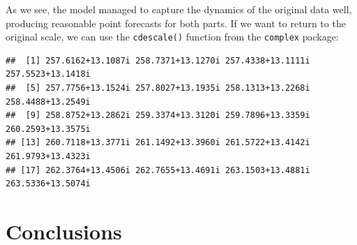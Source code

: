 \documentclass[
]{book}
\newenvironment{Shaded}{\begin{snugshade}}{\end{snugshade}}
\newcommand{\DataTypeTok}[1]{\textcolor[rgb]{0.13,0.29,0.53}{#1}}
\newcommand{\DecValTok}[1]{\textcolor[rgb]{0.00,0.00,0.81}{#1}}
\newcommand{\KeywordTok}[1]{\textcolor[rgb]{0.13,0.29,0.53}{\textbf{#1}}}
\newcommand{\NormalTok}[1]{#1}
\newcommand{\OperatorTok}[1]{\textcolor[rgb]{0.81,0.36,0.00}{\textbf{#1}}}
\newcommand{\OtherTok}[1]{\textcolor[rgb]{0.56,0.35,0.01}{#1}}
\newcommand{\StringTok}[1]{\textcolor[rgb]{0.31,0.60,0.02}{#1}}
\begin{document}
As we see, the model managed to capture the dynamics of the original data well, producing reasonable point forecasts for both parts. If we want to return to the original scale, we can use the \texttt{cdescale()} function from the \texttt{complex} package:

\begin{Shaded}
\end{Shaded}

\begin{verbatim}
##  [1] 257.6162+13.1087i 258.7371+13.1270i 257.4338+13.1111i 257.5523+13.1418i
##  [5] 257.7756+13.1524i 257.8027+13.1935i 258.1313+13.2268i 258.4488+13.2549i
##  [9] 258.8752+13.2862i 259.3374+13.3120i 259.7896+13.3359i 260.2593+13.3575i
## [13] 260.7118+13.3771i 261.1492+13.3960i 261.5722+13.4142i 261.9793+13.4323i
## [17] 262.3764+13.4506i 262.7655+13.4691i 263.1503+13.4881i 263.5336+13.5074i
\end{verbatim}

\hypertarget{Conclusions}{%
\chapter{Conclusions}\label{Conclusions}}

  
\end{document}
